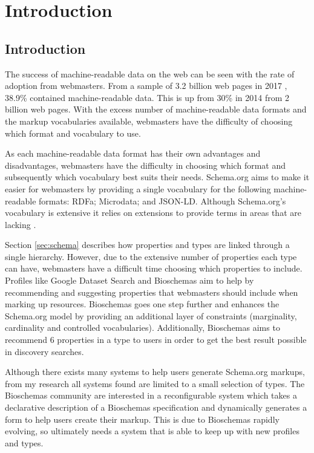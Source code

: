 
\chapter{Introduction}\label{ch:introduction}

\section{Introduction}
The success of machine-readable data on the web can be seen with the rate of adoption from webmasters. From a sample of 3.2 billion web pages in 2017 \cite{webDataCommons2017}, 38.9\% contained machine-readable data. This is up from 30\% in 2014 \cite{webDataCommons2014} from 2 billion web pages. With the excess number of machine-readable data formats and the markup vocabularies available, webmasters have the difficulty of choosing which format and vocabulary to use. 

As each machine-readable data format has their own advantages and disadvantages, webmasters have the difficulty in choosing which format and subsequently which vocabulary best suits their needs. Schema.org aims to make it easier for webmasters by providing a single vocabulary \cite{schemaOrg} for the following machine-readable formats: RDFa; Microdata; and JSON-LD. Although Schema.org's vocabulary is extensive it relies on extensions to provide terms in areas that are lacking \cite{schemaExtensions}. 

Section \ref{sec:schema} describes how properties and types are linked through a single hierarchy. However, due to the extensive number of properties each type can have, webmasters have a difficult time choosing which properties to include. Profiles like Google Dataset Search and Bioschemas aim to help by recommending and suggesting properties that webmasters should include when marking up resources. Bioschemas goes one step further and enhances the Schema.org model by providing an additional layer of constraints (marginality, cardinality and controlled vocabularies)\cite{gray2017bioschemas}. Additionally, Bioschemas aims to recommend 6 properties in a type to users in order to get the best result possible in discovery searches.

\newpage
Although there exists many systems to help users generate Schema.org markups, from my research all systems found are limited to a small selection of types. The Bioschemas community are interested in a reconfigurable system which takes a declarative description of a Bioschemas specification and dynamically generates a form to help users create their markup. This is due to Bioschemas rapidly evolving, so ultimately needs a system that is able to keep up with new profiles and types.

